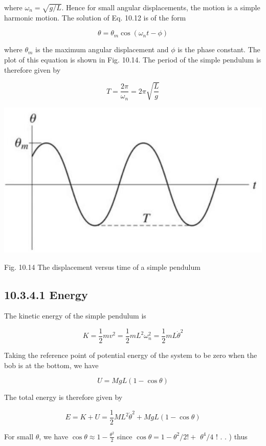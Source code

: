 \documentclass[10pt]{article}
\begin{document}
where $\omega_{n}=\sqrt{g / L}$. Hence for small angular displacements, the motion is a simple harmonic motion. The solution of Eq. 10.12 is of the form

$$
\theta=\theta_{m} \cos \left(\omega_{n} t-\phi\right)
$$

where $\theta_{m}$ is the maximum angular displacement and $\phi$ is the phase constant. The plot of this equation is shown in Fig. 10.14. The period of the simple pendulum is therefore given by

$$
T=\frac{2 \pi}{\omega_{n}}=2 \pi \sqrt{\frac{L}{g}}
$$

\begin{center}
\includegraphics[max width=\textwidth]{2024_09_13_db1f357d2aad0a03eb2eg-170(1)}
\end{center}

Fig. 10.14 The displacement versus time of a simple pendulum

\subsection*{10.3.4.1 Energy}
The kinetic energy of the simple pendulum is

$$
K=\frac{1}{2} m v^{2}=\frac{1}{2} m L^{2} \omega_{n}^{2}=\frac{1}{2} m L \dot{\theta}^{2}
$$

Taking the reference point of potential energy of the system to be zero when the bob is at the bottom, we have

$$
U=M g L(1-\cos \theta)
$$

The total energy is therefore given by

$$
E=K+U=\frac{1}{2} M L^{2} \dot{\theta}^{2}+M g L(1-\cos \theta)
$$

For small $\theta$, we have $\cos \theta \approx 1-\frac{\theta^{2}}{2}$ since $\cos \theta=1-\theta^{2} / 2!+$ $\theta^{4} / 4$ ! . . ) thus
\end{document}
